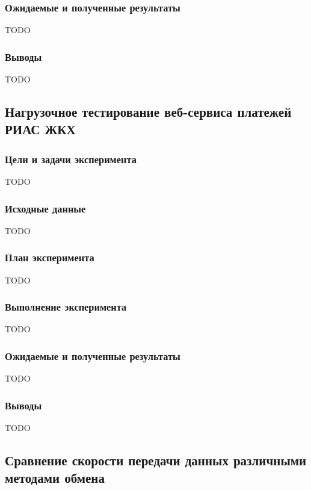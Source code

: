 \subsubsection*{Ожидаемые и полученные результаты}

TODO

\subsubsection*{Выводы}

TODO

\subsection{Нагрузочное тестирование веб-сервиса платежей РИАС ЖКХ}

\subsubsection*{Цели и задачи эксперимента}

TODO

\subsubsection*{Исходные данные}

TODO

\subsubsection*{План эксперимента}

TODO

\subsubsection*{Выполнение эксперимента}

TODO

\subsubsection*{Ожидаемые и полученные результаты}

TODO

\subsubsection*{Выводы}

TODO

\subsection{Сравнение скорости передачи данных различными методами обмена}

